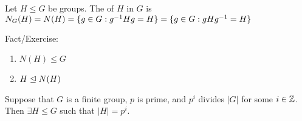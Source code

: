 \documentclass[notes.tex]{subfiles}
\begin{document}

\begin{defn}
	Let $H\le G$ be groups. The  of $H$ in $G$ is $N_G(H) =N(H) = \{g\in G:{g}^{-1}Hg = H\} = \{g\in G:gH{g}^{-1} = H\}$
\end{defn}
Fact/Exercise:
\begin{enumerate}
	\item $N(H) \le G$
	\item $H\trianglelefteq N(H)$
\end{enumerate}
\begin{theorem}[Sylow 1]
\label{sylow1}
\label{sylow}
	Suppose that $G$ is a finite group, $p$ is prime, and $p^i$ divides $|G|$ for some $i\in \mathbb{Z}$.
	Then $\exists H\le G$ such that $|H| = p^i$.
\end{theorem}
\end{document}
